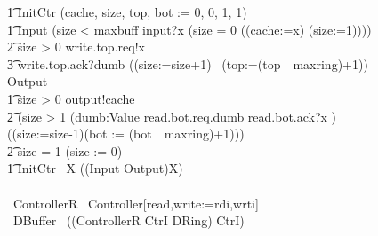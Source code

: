 \documentclass[10pt]{article}
\begin{document}
\begin{circus}
\t1 InitCtr \circdef (cache, size, top, bot := 0, 0, 1, 1) \\
\t1 Input \circdef  
	(\lcircguard size < maxbuff \rcircguard 
		\circguard input?x \then 
			(\lcircguard size = 0 \rcircguard 
				\circguard ((cache:=x) \circseq (size:=1))))\\
\t2 \extchoice \lcircguard size > 0 \rcircguard \circguard write.top.req!x \then \\
\t3 write.top.ack?dumb \then ((size:=size+1) \circseq\ (top:=(top~\mod~maxring)+1))
    \\
 Output \circdef \\
 \t1 \lcircguard size > 0 \rcircguard \circguard output!cache \then\\
 \t2 (\lcircguard size > 1 \rcircguard \circguard 
 	(\Intchoice dumb:Value \circspot read.bot.req.dumb \then read.bot.ack?x \then \Skip) \circseq \\
 	((size:=size-1)\circseq (bot := (bot~\mod~maxring)+1)))\\
 \t2 \extchoice \lcircguard size = 1 \rcircguard \circguard (size := 0) \\
\t1 \circspot InitCtr \circseq\ \circmu X \circspot ((Input \extchoice Output)\circseq X)
\\
\circend
\\
\circprocess\ ControllerR \circdef\ Controller[read,write:=rdi,wrti]
\\
\circprocess\ DBuffer \circdef\ ((ControllerR \lpar CtrI \rpar DRing) \circhide CtrI)
\end{circus}%
\end{document}
